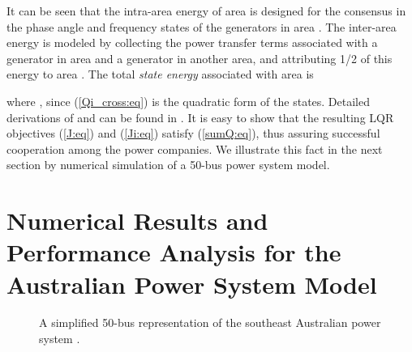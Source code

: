 \documentclass[12pt, draftclsnofoot,onecolumn]{IEEEtran}
\newcommand{\auswidth}{3.3in}
\newcommand{\auswidthb}{3.5in}
\newcommand{\auswidth}{4in}
\newcommand{\auswidthb}{4.5in}
\begin{document}
\vspace{-9pt}
 

\noindent
It can be seen that the intra-area energy of area  is designed for the consensus in the phase angle and frequency states of the generators in area . The inter-area energy is modeled by collecting the power transfer terms associated with a generator in area  and a generator in another area, and attributing 1/2 of this energy to area .
\noindent The total {\it state energy} associated with area  is 


\noindent where , since (\ref{Qi_cross:eq}) is the quadratic form of the states. Detailed derivations of  and  can be found in \cite{Lian:aa}. It is easy to show that the resulting LQR objectives (\ref{J:eq}) and (\ref{Ji:eq}) satisfy (\ref{sumQ:eq}), thus assuring successful cooperation among the power companies. We illustrate this fact in the next section by numerical simulation of a 50-bus power system model.




\section{Numerical Results and Performance Analysis for the Australian Power System Model}

\label{num:sec}

\begin{figure}[!t]
  	\centering
  	\caption{A simplified 50-bus representation of the southeast Australian power system \cite{Gibbard:2010aa}.}
  	\label{aus:fig}
  \end{figure}
\end{document}
